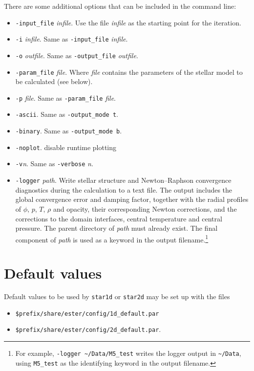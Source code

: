 \bigskip
There are some additional options that can be included in the command line:

\begin{itemize}
\item[] {\tt -input\_file} {\it infile}. Use the file {\it infile} as the starting point
for the iteration.
\item[] {\tt -i} {\it infile}. Same as {\tt -input\_file} {\it infile}.
\item[] {\tt -o} {\it outfile}. Same as {\tt -output\_file} {\it outfile}.
\item[] {\tt -param\_file} {\it file}. Where {\it file} contains the parameters of the 
stellar model to be calculated (see below).
\item[] {\tt -p} {\it file}. Same as {\tt -param\_file} {\it file}.
\item[] {\tt -ascii}. Same as {\tt -output\_mode t}.
\item[] {\tt -binary}. Same as {\tt -output\_mode b}.
\item[] {\tt -noplot}. disable runtime plotting %
\item[] {\tt -v}{\it n}. Same as {\tt -verbose} {\it n}.
\item[] {\tt -logger} {\it path}. Write stellar structure and
Newton--Raphson convergence diagnostics during the calculation to a text
file. The output includes the global convergence error and damping factor,
together with the radial profiles of $\phi$, $p$, $T$, $\rho$ and opacity,
their corresponding Newton corrections, and the corrections to the domain
interfaces, central temperature and central pressure. The parent directory
of {\it path} must already exist. The final component of {\it path} is used
as a keyword in the output filename.\footnote{For example, {\tt -logger \textasciitilde/Data/M5\_test}
writes the logger output in {\tt \textasciitilde/Data}, using
{\tt M5\_test} as the identifying keyword in the output filename.}
\end{itemize}

\section{Default values}

Default values to be used by {\tt star1d} or {\tt star2d} may be set up
with the files 
\begin{itemize}
\item[-]{\tt \$prefix/share/ester/config/1d\_default.par} 
\item[-]{\tt \$prefix/share/ester/config/2d\_default.par}.
\end{itemize}

